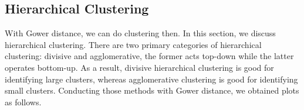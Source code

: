 \begin{table}[!h]
\begin{center}
\caption{\label{t2} Two pairs of observations in dataset. FhisW: family history of Overweight}
\end{center}
\end{table}


\subsection{Hierarchical Clustering}

With Gower distance, we can do clustering then. In this section, we discuss hierarchical clustering. There are two primary categories of hierarchical clustering: divisive and agglomerative, the former acts top-down while the latter operates bottom-up. As a result, divisive hierarchical clustering is good for identifying large clusters, whereas agglomerative clustering is good for identifying small clusters\cite{bridges1966hierarchical}. Conducting those methods with Gower distance, we obtained plots as follows.

